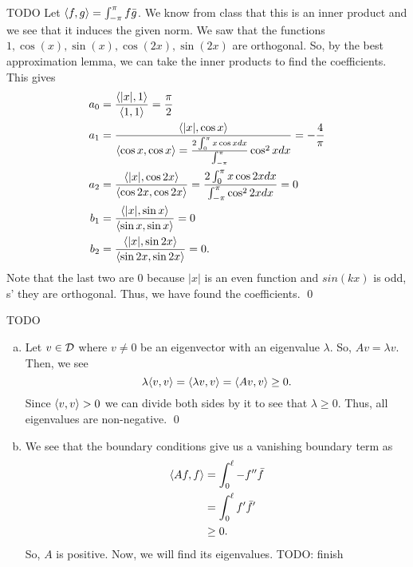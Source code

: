 \documentclass{article}
\begin{document}
\newpage
{} TODO
 \tri
\hop 
\solution
Let $\ang{f,g} = \int_{-\pi}^\pi f\bar{g}$. We know from class that this is an inner product and we see that it induces the given norm. We saw that the functions $1, \cos(x), \sin(x), \cos(2x), \sin(2x)$ are orthogonal. So, by the best approximation lemma, we can take the inner products to find the coefficients. This gives 
\begin{align*}
    a_0 &= \frac{\ang{|x|, 1}}{\ang{1,1}} = \frac{\pi}{2}\\
    a_1 &= \frac{\ang{|x|, \cos x}}{\ang{\cos x, \cos x} = \frac{2\int_0^\pi x \cos x dx}{\int_{-\pi}^\pi}\cos^2 x dx} = -\frac{4}{\pi} \\
    a_2 &= \frac{\ang{|x|, \cos 2x}}{\ang{\cos 2x, \cos 2x}} = \frac{2\int_0^\pi x \cos 2x dx}{\int_{-\pi}^\pi\cos^2 2x dx} = 0\\
    b_1 &= \frac{\ang{|x|, \sin x}}{\ang{\sin x, \sin x}} = 0 \\
    b_2&= \frac{\ang{|x|, \sin 2x}}{\ang{\sin 2x, \sin 2x}} = 0.
\end{align*}
Note that the last two are 0 because $|x|$ is an even function and $sin(kx)$ is odd, s' they are orthogonal. Thus, we have found the coefficients. \qed


\newpage
{} TODO
 \tri
\hop 
\solution
\begin{enumerate}[(a)]
    \item Let $v \in \cal{D}$ where $v \ne 0$ be an eigenvector with an eigenvalue $\lambda$. So, $Av = \lambda v$. Then, we see 
    \[\lambda \ang{v,v} = \ang{\lambda v, v} = \ang{Av, v} \ge 0.\]
    Since $\ang{v,v} >0$ we can divide both sides by it to see that $\lambda \ge 0$. Thus, all eigenvalues are non-negative. \qed
    \item We see that the boundary conditions give us a vanishing boundary term as 
    \begin{align*}
        \ang{Af, f} &= \int_0^\ell -f''\bar{f} \\
        &=  \int_0^\ell f'\bar{f}'\\
        &\ge 0.
    \end{align*}
    So, $A$ is positive. 
    \hop
    Now, we will find its eigenvalues.
    TODO: finish 
\end{enumerate}
\end{document}
